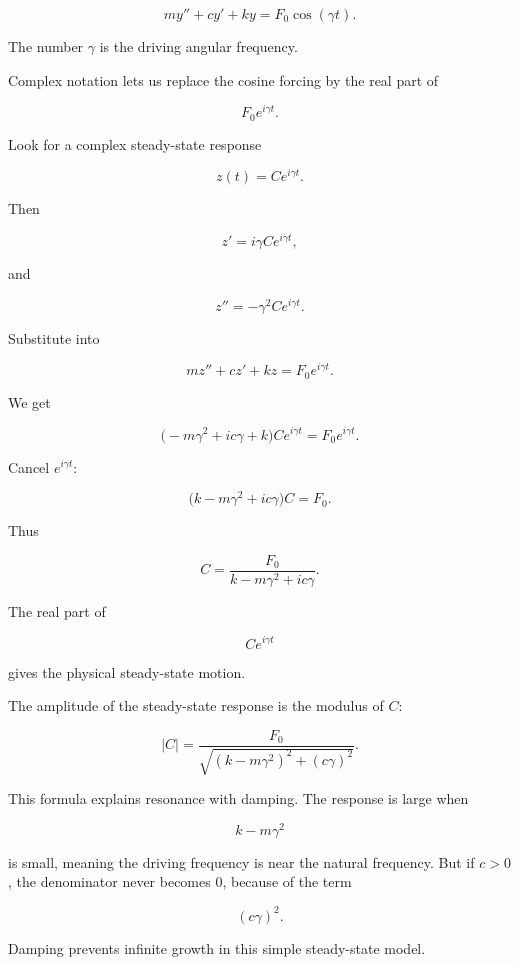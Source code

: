 \[
\boxed{
my''+cy'+ky=F_0\cos(\gamma t).
}
\]

The number \(\gamma\) is the driving angular frequency.

Complex notation lets us replace the cosine forcing by the real part of

\[
F_0e^{i\gamma t}.
\]

Look for a complex steady-state response

\[
z(t)=Ce^{i\gamma t}.
\]

Then

\[
z'=i\gamma Ce^{i\gamma t},
\]

and

\[
z''=-\gamma^2Ce^{i\gamma t}.
\]

Substitute into

\[
mz''+cz'+kz=F_0e^{i\gamma t}.
\]

We get

\[
\bigl(-m\gamma^2+i c\gamma+k\bigr)Ce^{i\gamma t}
=
F_0e^{i\gamma t}.
\]

Cancel \(e^{i\gamma t}\):

\[
\bigl(k-m\gamma^2+i c\gamma\bigr)C=F_0.
\]

Thus

\[
\boxed{
C=\frac{F_0}{k-m\gamma^2+i c\gamma}.
}
\]

The real part of

\[
Ce^{i\gamma t}
\]

gives the physical steady-state motion.

The amplitude of the steady-state response is the modulus of \(C\):

\[
\boxed{
|C|
=
\frac{F_0}
{\sqrt{(k-m\gamma^2)^2+(c\gamma)^2}}.
}
\]

This formula explains resonance with damping.  The response is large when

\[
k-m\gamma^2
\]

is small, meaning the driving frequency is near the natural frequency.  But if \(c>0\),
the denominator never becomes \(0\), because of the term

\[
(c\gamma)^2.
\]

Damping prevents infinite growth in this simple steady-state model.

